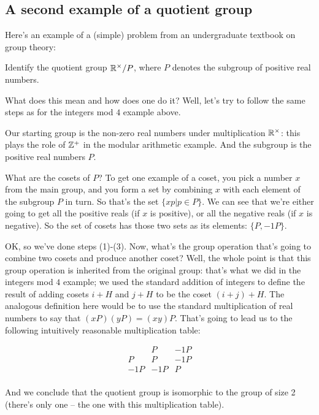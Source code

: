 \subsection{A second example of a quotient group}

Here's an example of a (simple) problem from an undergraduate textbook on group theory:\\

\begin{mdframed}
  Identify the quotient group $\mathbb{R}^\times/P$, where $P$ denotes the subgroup of
  positive real numbers.
\end{mdframed}

What does this mean and how does one do it? Well, let's try to follow the same
steps as for the integers mod $4$ example above.

Our starting group is the non-zero real numbers under multiplication $\mathbb{R}^\times$:
this plays the role of $\mathbb{Z}^+$ in the modular arithmetic example. And the
subgroup is the positive real numbers $P$.

What are the cosets of $P$? To get one example of a coset, you pick a number
$x$ from the main group, and you form a set by combining $x$ with each element
of the subgroup $P$ in turn. So that's the set $\{xp|p \in P\}$. We can see
that we're either going to get all the positive reals (if $x$ is positive), or
all the negative reals (if $x$ is negative). So the set of cosets has those two
sets as its elements: $\{P, -1P\}$.

OK, so we've done steps (1)-(3). Now, what's the group operation that's going
to combine two cosets and produce another coset? Well, the whole point is that
this group operation is inherited from the original group: that's what we did
in the integers mod $4$ example; we used the standard addition of integers to
define the result of adding cosets $i+H$ and $j+H$ to be the coset
$(i+j)+H$. The analogous definition here would be to use the standard
multiplication of real numbers to say that $(xP)(yP) = (xy)P$. That's going to
lead us to the following intuitively reasonable multiplication table:

$$
\begin{array}{ c|cc }
 ~   & P   & -1P \\
 \hline
 P   & P   & -1P \\
 -1P & -1P & P \\
\end{array}
$$

And we conclude that the quotient group is isomorphic to the group of size 2
(there's only one -- the one with this multiplication table).

